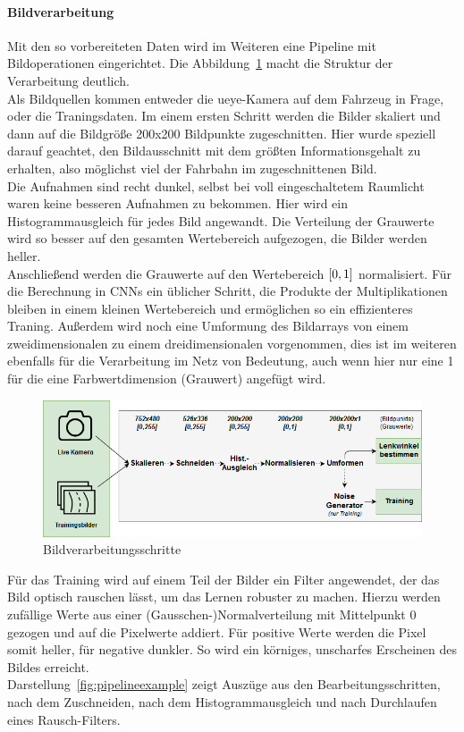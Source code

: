 \paragraph{Bildverarbeitung}
Mit den so vorbereiteten Daten wird im Weiteren eine Pipeline mit Bildoperationen eingerichtet. Die Abbildung~\ref{fig:dronetfrozen} macht die Struktur der Verarbeitung deutlich.\\
Als Bildquellen kommen entweder die ueye-Kamera auf dem Fahrzeug in Frage, oder die Traningsdaten. Im einem ersten Schritt werden die Bilder skaliert und dann auf die Bildgröße 200x200 Bildpunkte zugeschnitten. Hier wurde speziell darauf geachtet, den Bildausschnitt mit dem größten Informationsgehalt zu erhalten, also möglichst viel der Fahrbahn im zugeschnittenen Bild.\\
Die Aufnahmen sind recht dunkel, selbst bei voll eingeschaltetem Raumlicht waren keine besseren Aufnahmen zu bekommen. Hier wird ein Histogrammausgleich für jedes Bild angewandt. Die Verteilung der Grauwerte wird so besser auf den gesamten Wertebereich aufgezogen, die Bilder werden heller.\\
Anschließend werden die Grauwerte auf den Wertebereich $\interval{0}{1}$ normalisiert. Für die Berechnung in CNNs ein üblicher Schritt, die Produkte der Multiplikationen bleiben in einem kleinen Wertebereich und ermöglichen so ein effizienteres Traning. Außerdem wird noch eine Umformung des Bildarrays von einem zweidimensionalen zu einem dreidimensionalen vorgenommen, dies ist im weiteren ebenfalls für die Verarbeitung im Netz von Bedeutung, auch wenn hier nur eine 1 für die eine Farbwertdimension (Grauwert) angefügt wird.

\begin{figure}[h]
	\centering
	\includegraphics[scale=0.56]{figures/Pipeline.png}
	\caption{Bildverarbeitungsschritte}
	\label{fig:dronetfrozen}
\end{figure}

Für das Training wird auf einem Teil der Bilder ein Filter angewendet, der das Bild optisch rauschen lässt, um das Lernen robuster zu machen. Hierzu werden zufällige Werte aus einer (Gausschen-)Normalverteilung mit Mittelpunkt 0 gezogen und auf die Pixelwerte addiert. Für positive Werte werden die Pixel somit heller, für negative dunkler. So wird ein körniges, unscharfes Erscheinen des Bildes erreicht.\\
Darstellung~\ref{fig:pipelineexample} zeigt Auszüge aus den Bearbeitungsschritten, nach dem Zuschneiden, nach dem Histogrammausgleich und nach Durchlaufen eines Rausch-Filters.

